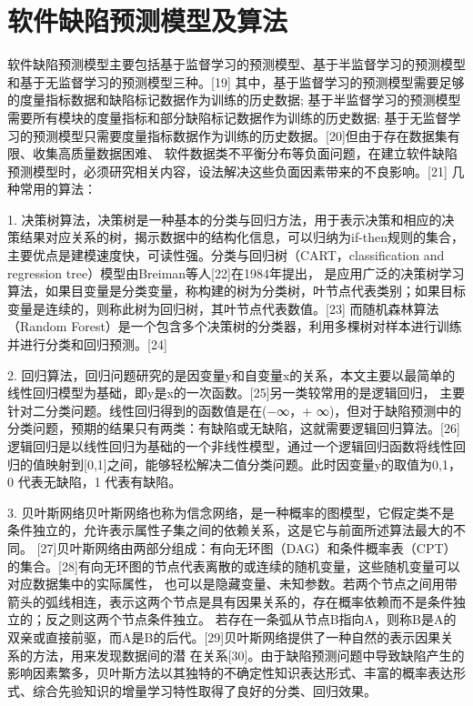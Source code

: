 \documentclass[12pt, a4paper]{article}
\begin{document}
\section{软件缺陷预测模型及算法}

软件缺陷预测模型主要包括基于监督学习的预测模型、基于半监督学习的预测模型和基于无监督学习的预测模型三种。[19]
其中，基于监督学习的预测模型需要足够的度量指标数据和缺陷标记数据作为训练的历史数据; 
基于半监督学习的预测模型需要所有模块的度量指标和部分缺陷标记数据作为训练的历史数据;
基于无监督学习的预测模型只需要度量指标数据作为训练的历史数据。[20]但由于存在数据集有限、收集高质量数据困难、
软件数据类不平衡分布等负面问题，在建立软件缺陷预测模型时，必须研究相关内容，设法解决这些负面因素带来的不良影响。[21]
几种常用的算法：

1. 决策树算法，决策树是一种基本的分类与回归方法，用于表示决策和相应的决策结果对应关系的树，揭示数据中的结构化信息，可以归纳为if-then规则的集合，
主要优点是建模速度快，可读性强。分类与回归树（CART，classification and regression tree）模型由Breiman等人[22]在1984年提出，
是应用广泛的决策树学习算法，如果目变量是分类变量，称构建的树为分类树，叶节点代表类别；如果目标变量是连续的，则称此树为回归树，其叶节点代表数值。[23]
而随机森林算法（Random Forest）是一个包含多个决策树的分类器，利用多棵树对样本进行训练并进行分类和回归预测。[24]

2. 回归算法，回归问题研究的是因变量y和自变量x的关系，本文主要以最简单的线性回归模型为基础，即y是x的一次函数。[25]另一类较常用的是逻辑回归，
主要针对二分类问题。线性回归得到的函数值是在(−∞，+ ∞)，但对于缺陷预测中的分类问题，预期的结果只有两类：有缺陷或无缺陷，这就需要逻辑回归算法。[26]
逻辑回归是以线性回归为基础的一个非线性模型，通过一个逻辑回归函数将线性回归的值映射到[0,1]之间，能够轻松解决二值分类问题。此时因变量y的取值为{0,1}，
0 代表无缺陷，1 代表有缺陷。

3. 贝叶斯网络贝叶斯网络也称为信念网络，是一种概率的图模型，它假定类不是条件独立的，允许表示属性子集之间的依赖关系，这是它与前面所述算法最大的不同。
[27]贝叶斯网络由两部分组成：有向无环图（DAG）和条件概率表（CPT）的集合。[28]有向无环图的节点代表离散的或连续的随机变量，这些随机变量可以对应数据集中的实际属性，
也可以是隐藏变量、未知参数。若两个节点之间用带箭头的弧线相连，表示这两个节点是具有因果关系的，存在概率依赖而不是条件独立的；反之则这两个节点条件独立。
若存在一条弧从节点B指向A，则称B是A的双亲或直接前驱，而A是B的后代。[29]贝叶斯网络提供了一种自然的表示因果关系的方法，用来发现数据间的潜
在关系[30]。由于缺陷预测问题中导致缺陷产生的影响因素繁多，贝叶斯方法以其独特的不确定性知识表达形式、丰富的概率表达形式、综合先验知识的增量学习特性取得了良好的分类、回归效果。
\end{document}
